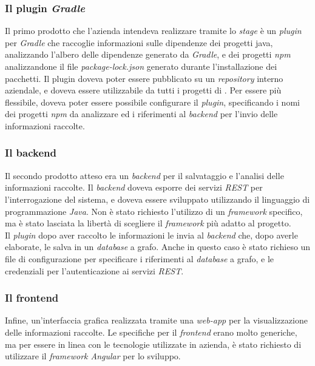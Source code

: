 \subsubsection*{Il plugin \textit{Gradle}}
Il primo prodotto che l'azienda intendeva realizzare tramite lo \textit{stage} è un \textit{plugin} per \textit{Gradle} che raccoglie informazioni sulle dipendenze dei progetti java, 
analizzando l'albero delle dipendenze generato da \textit{Gradle}, e dei progetti \textit{npm} analizzandone il file \textit{package-lock.json} generato
durante l'installazione dei pacchetti.
Il plugin doveva poter essere pubblicato su un \textit{repository} interno aziendale, e doveva essere utilizzabile da tutti i progetti di {\azienda}.
Per essere più flessibile, doveva poter essere possibile configurare il \textit{plugin}, specificando i nomi dei progetti \textit{npm} da analizzare
ed i riferimenti al \textit{backend} per l'invio delle informazioni raccolte.\\

\subsubsection*{Il backend}
Il secondo prodotto atteso era un \textit{backend} per il salvataggio e l'analisi delle informazioni raccolte. 
Il \textit{backend} doveva esporre dei servizi \textit{REST} per l'interrogazione del sistema, e doveva essere sviluppato utilizzando
il linguaggio di programmazione \textit{Java}. Non è stato richiesto l'utilizzo di un \textit{framework} specifico, ma è stato lasciata
la libertà di scegliere il \textit{framework} più adatto al progetto.\\
Il \textit{plugin} dopo aver raccolto le informazioni
le invia al \textit{backend} che,  dopo averle elaborate, le salva in un \textit{database} a grafo.
Anche in questo caso è stato richieso un file di configurazione per specificare i riferimenti al \textit{database} a grafo, e le credenziali
per l'autenticazione ai servizi \textit{REST}.\\

\subsubsection*{Il frontend}
Infine, un'interfaccia grafica realizzata tramite una \textit{web-app} per la visualizzazione delle informazioni raccolte.
Le specifiche per il \textit{frontend} erano molto generiche, ma per essere in linea con le tecnologie utilizzate in azienda,
è stato richiesto di utilizzare il \textit{framework Angular} per lo sviluppo.\\

